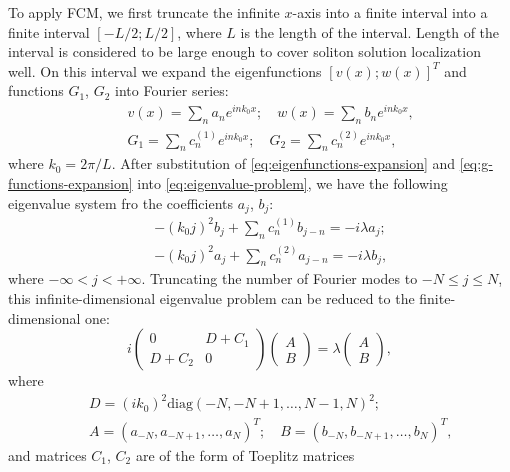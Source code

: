To apply FCM, we first truncate the infinite $x$-axis into a finite interval into  a finite interval $[-L/2; L/2]$, where $L$ is the length of the interval.
Length of the interval is considered to be large enough to cover soliton solution localization well.
On this interval we expand the eigenfunctions $[v(x); w(x)]^T$ and functions $G_1$, $G_2$ into Fourier series:
\begin{eqnarray*}
	&& 	v(x) = \sum \limits_n a_n e^{i n k_0 x}; \quad w(x) = \sum \limits_n b_n e^{i n k_0 x}, \label{eq:eigenfunctions-expansion} \\
	&& G_1 = \sum \limits_n c_n^{(1)} e^{i n k_0 x}; \quad G_2 = \sum \limits_n c_n^{(2)} e^{i n k_0 x} \label{eq:g-functions-expansion},
\end{eqnarray*}
where $k_0 = 2 \pi / L$.
After substitution of \eqref{eq:eigenfunctions-expansion} and \eqref{eq:g-functions-expansion} into \eqref{eq:eigenvalue-problem}, we have the following eigenvalue system fro the coefficients $a_j$, $b_j$:
\begin{eqnarray}
	&& -(k_0 j)^2 b_j + \sum \limits_n 	c_n^{(1)} b_{j - n} = -i \lambda a_j; \\
	&& -(k_0 j)^2 a_j + \sum \limits_n 	c_n^{(2)} a_{j - n} = -i \lambda b_j,
\end{eqnarray}
where $-\infty < j < +\infty$.
Truncating the number of Fourier modes to $-N \le j \le N$, this infinite-dimensional eigenvalue problem can be reduced to the finite-dimensional one:
\begin{equation}
	i
	\begin{pmatrix}
		0 & D + C_1 \\ D + C_2 & 0
	\end{pmatrix}
	\begin{pmatrix}
		A \\ B
	\end{pmatrix}
	= \lambda
	\begin{pmatrix}
		A \\ B
	\end{pmatrix},
\label{eq:eigenvalue-problem-matrix}
\end{equation}
where
\begin{eqnarray*}
	&& D = (ik_0)^2 \mathrm{diag}(-N, -N+1, \dots, N-1, N)^2; \\
	&& A = (a_{-N}, a_{-N+1}, \dots, a_N)^T; \quad B = (b_{-N}, b_{-N+1}, \dots, b_N)^T,
\end{eqnarray*}
and matrices $C_1$, $C_2$ are of the form of Toeplitz matrices
